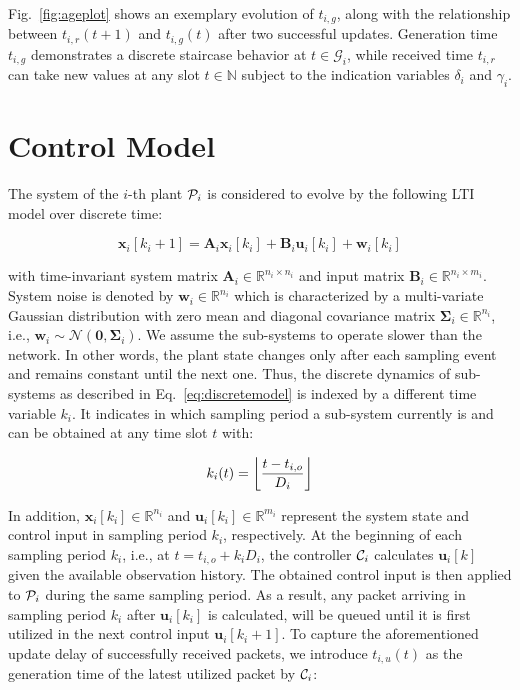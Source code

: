 Fig.~\ref{fig:ageplot} shows an exemplary evolution of $t_{i,g}$, along with the
relationship between ${t_{i,r}(t+1)}$ and $t_{i,g}(t)$ after two successful
updates. Generation time $t_{i,g}$ demonstrates a discrete staircase behavior at
$t \in \mathcal{G}_i$, while received time $t_{i,r}$ can take new values at any
slot $t \in \mathbb{N}$ subject to the indication variables $\delta_i$ and
$\gamma_i$.

\section{Control Model} \label{sec:control}

The system of the $i$-th plant $\mathcal{P}_i$ is considered to evolve by the following
LTI model over discrete time:

\begin{equation}
  \label{eq:discretemodel}
  \boldsymbol{x}_i[k_i+1] = \boldsymbol{A}_i \boldsymbol{x}_i[k_i] + \boldsymbol{B}_i \boldsymbol{u}_i[k_i] + \boldsymbol{w}_i[k_i]
\end{equation}

with time-invariant system matrix $\boldsymbol{A}_i \in \mathbb{R}^{n_i\times
n_i}$ and input matrix $\boldsymbol{B}_i \in \mathbb{R}^{n_i\times m_i}$. System
noise is denoted by $\boldsymbol{w}_i \in \mathbb{R}^{n_i}$ which is
characterized by a multi-variate Gaussian distribution with zero mean and
diagonal covariance matrix $\mathbf{\Sigma}_i \in \mathbb{R}^{n_i}$, i.e.,
$\boldsymbol{w}_i \sim \mathcal{N}(\mathbf{0}, \mathbf{\Sigma}_i)$. We assume
the sub-systems to operate slower than the network. In other words, the plant
state changes only after each sampling event and remains constant until the next
one. Thus, the discrete dynamics of sub-systems as described in
Eq.~\eqref{eq:discretemodel} is indexed by a different time variable $k_i$. It
indicates in which sampling period a sub-system currently is and can be obtained
at any time slot $t$ with:

\begin{equation}
  \label{eq:k_map}
	k_i(t) = \left\lfloor \frac{t - t_{i,o}}{D_i} \right\rfloor
\end{equation}

In addition, $\boldsymbol{x}_i[k_i] \in \mathbb{R}^{n_i}$ and
$\boldsymbol{u}_i[k_i] \in \mathbb{R}^{m_i}$ represent the system state and
control input in sampling period $k_i$, respectively. At the beginning of each
sampling period $k_i$, i.e., at $t=t_{i,o}+k_iD_i$, the controller $\mathcal{C}_i$
calculates $\boldsymbol{u}_i[k]$ given the available observation history. The
obtained control input is then applied to $\mathcal{P}_i$ during the same sampling
period. As a result, any packet arriving in sampling period $k_i$ after
$\boldsymbol{u}_i[k_i]$ is calculated, will be queued until it is first utilized
in the next control input $\boldsymbol{u}_i[k_i+1]$. To capture the
aforementioned update delay of successfully received packets, we introduce
$t_{i,u}(t)$ as the generation time of the latest utilized packet by
$\mathcal{C}_i$:


